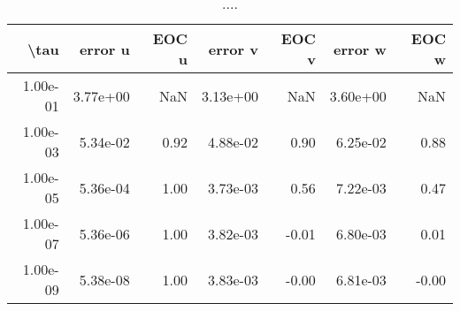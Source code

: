 \begin{table}[ht]
\centering
\begin{tabular}{rrrrrrr}
  \hline
  \textbf{\textbackslash{}tau} & \textbf{error u} & \textbf{EOC u} & \textbf{error v} & \textbf{EOC v} & \textbf{error w} & \textbf{EOC w} \\\hline
  1.00e-01 & 3.77e+00 & NaN & 3.13e+00 & NaN & 3.60e+00 & NaN \\
  1.00e-03 & 5.34e-02 & 0.92 & 4.88e-02 & 0.90 & 6.25e-02 & 0.88 \\
  1.00e-05 & 5.36e-04 & 1.00 & 3.73e-03 & 0.56 & 7.22e-03 & 0.47 \\
  1.00e-07 & 5.36e-06 & 1.00 & 3.82e-03 & -0.01 & 6.80e-03 & 0.01 \\
  1.00e-09 & 5.38e-08 & 1.00 & 3.83e-03 & -0.00 & 6.81e-03 & -0.00 \\\hline
\end{tabular}
\caption{....}
\end{table}
